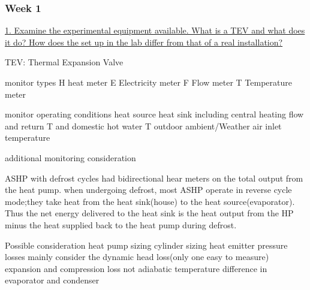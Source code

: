 \documentclass[12pt]{article}
\begin{document}
\subsubsection{Week 1}
\ul{1. Examine the experimental equipment available. What is a TEV and what does it do? How does the set up in the lab differ from that of a real installation?}
\par 
TEV: Thermal Expansion Valve



monitor types
H heat meter
E Electricity meter
F Flow meter 
T Temperature meter

monitor operating conditions
heat source 
heat sink including central heating flow and return T and domestic hot water T
outdoor ambient/Weather
air inlet temperature 



additional monitoring consideration

ASHP with defrost cycles had bidirectional hear meters on the total output  from the heat pump. when undergoing defrost, most ASHP operate in reverse cycle mode;they take heat from the heat sink(house) to the heat source(evaporator). Thus the net energy delivered to the heat sink is the heat output from the HP minus the heat supplied back to the heat pump during defrost.



Possible consideration
heat pump sizing
cylinder sizing
heat emitter
pressure losses mainly consider the dynamic head loss(only one easy to measure)
expansion and compression loss not adiabatic
temperature difference in evaporator and condenser






\newpage

\begin{appendices}









\end{appendices}

\end{document}
